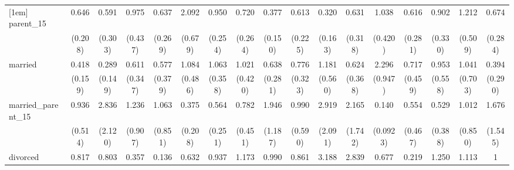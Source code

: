 {\begin{tabular}{l*{16}{c}}
[1em]
parent\_15           &       0.646         &       0.591         &       0.975         &       0.637         &       2.092\sym{*}  &       0.950         &       0.720         &       0.377\sym{*}  &       0.613         &       0.320\sym{*}  &       0.631         &       1.038         &       0.616         &       0.902         &       1.212         &       0.674         \\
                    &     (0.208)         &     (0.303)         &     (0.437)         &     (0.269)         &     (0.679)         &     (0.254)         &     (0.264)         &     (0.150)         &     (0.225)         &     (0.163)         &     (0.318)         &     (0.420)         &     (0.281)         &     (0.330)         &     (0.509)         &     (0.284)         \\
[1em]
married             &       0.418\sym{*}  &       0.289\sym{*}  &       0.611         &       0.577         &       1.084         &       1.063         &       1.021         &       0.638         &       0.776         &       1.181         &       0.624         &       2.296\sym{*}  &       0.717         &       0.953         &       1.041         &       0.394         \\
                    &     (0.159)         &     (0.149)         &     (0.347)         &     (0.379)         &     (0.486)         &     (0.358)         &     (0.420)         &     (0.281)         &     (0.323)         &     (0.560)         &     (0.368)         &     (0.947)         &     (0.459)         &     (0.558)         &     (0.703)         &     (0.290)         \\
[1em]
married\_parent\_15   &       0.936         &       2.836         &       1.236         &       1.063         &       0.375         &       0.564         &       0.782         &       1.946         &       0.990         &       2.919         &       2.165         &       0.140\sym{**} &       0.554         &       0.529         &       1.012         &       1.676         \\
                    &     (0.514)         &     (2.120)         &     (0.907)         &     (0.851)         &     (0.208)         &     (0.251)         &     (0.451)         &     (1.187)         &     (0.590)         &     (2.091)         &     (1.742)         &    (0.0923)         &     (0.467)         &     (0.388)         &     (0.850)         &     (1.545)         \\
[1em]
divorced            &       0.817         &       0.803         &       0.357         &       0.136         &       0.632         &       0.937         &       1.173         &       0.990         &       0.861         &       3.188         &       2.839         &       0.677         &       0.219         &       1.250         &       1.113         &           1         \\

\end{tabular}}
